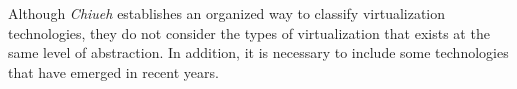 	Although \textit{Chiueh} \cite{Chiueh2005} establishes an organized way to classify virtualization technologies, they do not consider the types of virtualization that exists at the same level of abstraction. In addition, it is necessary to include some technologies that have emerged in recent years.